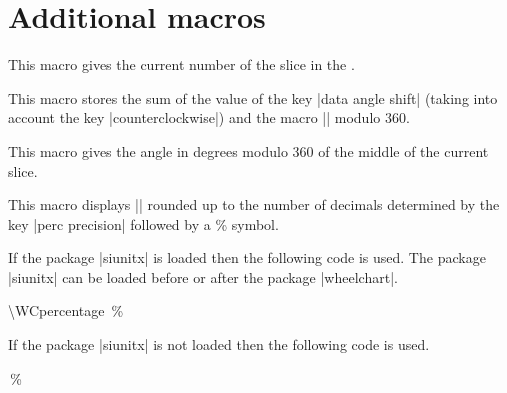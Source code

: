 \documentclass[a4paper,english,dvipsnames]{ltxdoc}
\begin{document}
\section{Additional macros}
\begin{command}{\WCcount}
This macro gives the current number of the slice in the .
\begin{codeexample}[width=10cm]
\begin{tikzpicture}
\wheelchart[
    inner data=\WCcount
]{\exampleforthismanual}
\end{tikzpicture}
\end{codeexample}
\end{command}
\begin{command}{\WCdataangle}
This macro stores the sum of the value of the key |data angle shift| (taking into account the key |counterclockwise|) and the macro |\WCmidangle| modulo $360$.
\end{command}
\begin{command}{\WCmidangle}
This macro gives the angle in degrees modulo $360$ of the middle of the current slice.
\begin{codeexample}[width=10cm]
\begin{tikzpicture}
\wheelchart[
    data angle shift=\WCvarG,
    data style={
        rotate=\WCdataangle,
        draw=Magenta,
        fill=GreenYellow,
        anchor=west,
        text=Gray
    }
]{\exampleforthismanual}
\wheelchart[
    data={},
    inner data={%
        \textbackslash WCmidangle%
    },
    inner data style={
        rotate=\WCmidangle,
        font=\ttfamily
    },
    slices style={fill=none}
]{\exampleforthismanual}
\end{tikzpicture}
\end{codeexample}
\end{command}
\begin{command}{\WCperc}
This macro displays |\WCpercentage| rounded up to the number of decimals determined by the key |perc precision| followed by a \unit{\percent} symbol.

If the package |siunitx| is loaded then the following code is used. The package |siunitx| can be loaded before or after the package |wheelchart|.
\begin{codeexample}
\qty[round-mode=places,
     round-precision=\pgfkeysvalueof{/wheelchart/perc precision}]{\WCpercentage}{\percent}
\end{codeexample}
If the package |siunitx| is not loaded then the following code is used.
\begin{codeexample}
\WCpercentagerounded\,\%
\end{codeexample}
\end{command}
\end{document}
